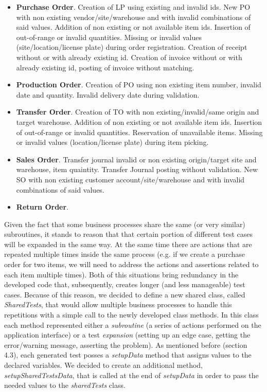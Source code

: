 \begin{itemize}
    \item \textbf{Purchase Order}. Creation of LP using existing and invalid ids. New PO with non existing vendor/site/warehouse and with invalid combinations of said values. Addition of non existing or not available item ids. Insertion of out-of-range or invalid quantities. Missing or invalid values (site/location/license plate) during order registration. Creation of receipt without or with already existing id. Creation of invoice without or with already existing id, posting of invoice without matching. 
    \item \textbf{Production Order}. Creation of PO using non existing item number, invalid date and quantity. Invalid delivery date during validation. 
    \item \textbf{Transfer Order}. Creation of TO with non existing/invalid/same origin and target warehouse. Addition of non existing or not available item ids. Insertion of out-of-range or invalid quantities. Reservation of unavailable items. Missing or invalid values (location/license plate) during item picking.
    \item \textbf{Sales Order}. Transfer journal invalid or non existing origin/target site and warehouse, item quaintity. Transfer Journal posting without validation. New SO with non existing customer account/site/warehouse and with invalid combinations of said values.
    \item \textbf{Return Order}.
\end{itemize}

Given the fact that some business processes share the same (or very similar) subroutines, it stands to reason that that certain portion of different test cases will be expanded in the same way. At the same time there are actions that are repeated multiple times inside the same process (e.g. if we create a purchase order for two items, we will need to address the actions and assertions related to each item multiple times). Both of this situations bring redundancy in the developed code that, subsequently, creates longer (and less manageable) test cases. Because of this reason, we decided to define a new shared class, called \textit{SharedTests}, that would allow multiple business processes to handle this repetitions with a simple call to the newly developed class methods. In this class each method represented either a \textit{subroutine} (a series of actions performed on the application interface) or a test \textit{expansion} (setting up an edge case, getting the error/warning message, asserting the problem). As mentioned before (section 4.3), each generated test posses a \textit{setupData} method that assigns values to the declared variables. We decided to create an additional method, \textit{setupSharedTestsData}, that is called at the end of \textit{setupData} in order to pass the needed values to the \textit{sharedTests} class. 

